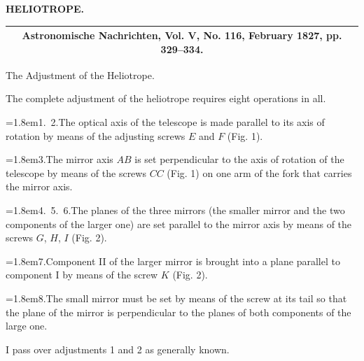 \par\clearpage
\noindent{}\hfill{\small\textbf{HELIOTROPE.}}\hfill\null\par
\vspace*{4.4cm}
\begin{center}
\begin{tabular}{c}\hline
\small\textbf{Astronomische Nachrichten, Vol. V, No. 116, February 1827, pp. 329--334.}\\\hline
\end{tabular}\par\bigskip
{\large The Adjustment of the Heliotrope.}
\end{center}
\par\noindent\hspace*{\parindent}The complete adjustment of the heliotrope requires eight operations in all.
\par\noindent\hangindent=1.8em\hspace*{1em}1.\ 2.\quad The optical axis of the telescope is made parallel to its axis of rotation by means of the adjusting screws $E$ and $F$ (Fig. 1).
\par\noindent\hangindent=1.8em\hspace*{1em}3.\quad The mirror axis $AB$ is set perpendicular to the axis of rotation of the telescope by means of the screws $CC$ (Fig. 1) on one arm of the fork that carries the mirror axis.
\par\noindent\hangindent=1.8em\hspace*{1em}4.\ 5.\ 6.\quad The planes of the three mirrors (the smaller mirror and the two components of the larger one) are set parallel to the mirror axis by means of the screws $G$, $H$, $I$ (Fig. 2).
\par\noindent\hangindent=1.8em\hspace*{1em}7.\quad Component II of the larger mirror is brought into a plane parallel to component I by means of the screw $K$ (Fig. 2).
\par\noindent\hangindent=1.8em\hspace*{1em}8.\quad The small mirror must be set by means of the screw at its tail so that the plane of the mirror is perpendicular to the planes of both components of the large one.
\par\noindent\hspace*{\parindent}I pass over adjustments 1 and 2 as generally known.

